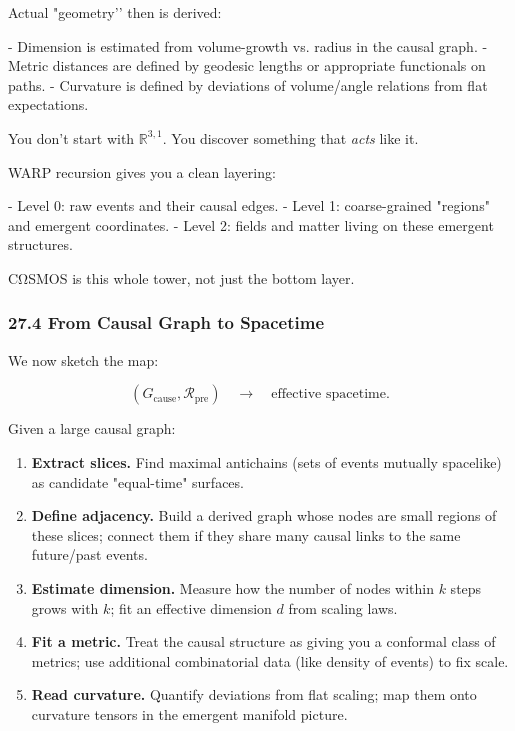 Actual "geometry’’ then is derived:

- Dimension is estimated from volume-growth vs. radius in the causal graph.
- Metric distances are defined by geodesic lengths or appropriate functionals on paths.
- Curvature is defined by deviations of volume/angle relations from flat expectations.

You don’t start with $\mathbb{R}^{3,1}$. You discover something that \emph{acts} like it.

WARP recursion gives you a clean layering:

- Level 0: raw events and their causal edges.
- Level 1: coarse-grained "regions" and emergent coordinates.
- Level 2: fields and matter living on these emergent structures.

CΩSMOS is this whole tower, not just the bottom layer.

\subsubsection*{27.4  From Causal Graph to Spacetime}

We now sketch the map:

\[
  (G_\text{cause}, \mathcal{R}_\text{pre}) \quad\longrightarrow\quad \text{effective spacetime}.
\]

Given a large causal graph:

\begin{enumerate}
  \item \textbf{Extract slices.} Find maximal antichains (sets of events mutually spacelike) as candidate "equal-time" surfaces.

  \item \textbf{Define adjacency.} Build a derived graph whose nodes are small regions of these slices; connect them if they share many causal links to the same future/past events.

  \item \textbf{Estimate dimension.} Measure how the number of nodes within $k$ steps grows with $k$; fit an effective dimension $d$ from scaling laws.

  \item \textbf{Fit a metric.} Treat the causal structure as giving you a conformal class of metrics; use additional combinatorial data (like density of events) to fix scale.

  \item \textbf{Read curvature.} Quantify deviations from flat scaling; map them onto curvature tensors in the emergent manifold picture.
\end{enumerate}

